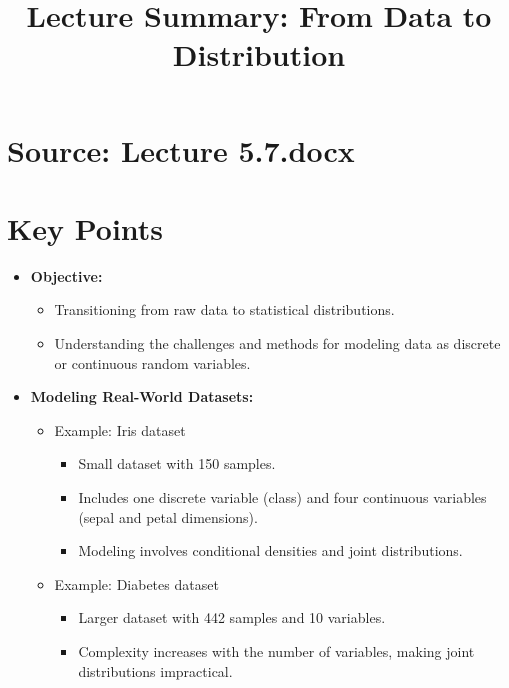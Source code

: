 \documentclass{article}
\title{Lecture Summary: From Data to Distribution}
\author{}
\date{}
\begin{document}
\maketitle

\section*{Source: Lecture 5.7.docx}

\section*{Key Points}

\begin{itemize}
  \item \textbf{Objective:}
    \begin{itemize}
      \item Transitioning from raw data to statistical distributions.
      \item Understanding the challenges and methods for modeling data as discrete or continuous random variables.
    \end{itemize}

  \item \textbf{Modeling Real-World Datasets:}
    \begin{itemize}
      \item Example: Iris dataset
        \begin{itemize}
          \item Small dataset with 150 samples.
          \item Includes one discrete variable (class) and four continuous variables (sepal and petal dimensions).
          \item Modeling involves conditional densities and joint distributions.
        \end{itemize}
      \item Example: Diabetes dataset
        \begin{itemize}
          \item Larger dataset with 442 samples and 10 variables.
          \item Complexity increases with the number of variables, making joint distributions impractical.
        \end{itemize}
    \end{itemize}


\end{itemize}
\end{document}
